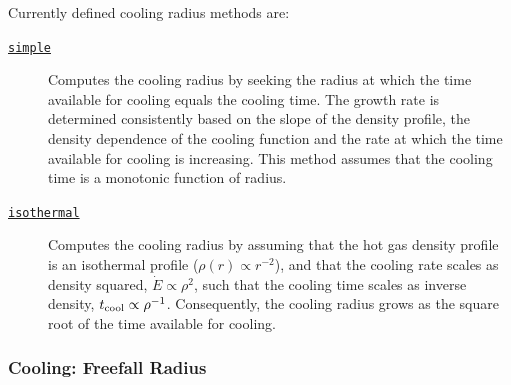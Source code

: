 Currently defined cooling radius methods are:
\begin{description}
 \item [\hyperlink{cooling.cooling_radius.simple.F90:cooling_radii_simple:cooling_radius_simple}{{\tt simple}}] Computes the cooling radius by seeking the radius at which the time available for cooling equals the cooling time. The growth rate is determined consistently based on the slope of the density profile, the density dependence of the cooling function and the rate at which the time available for cooling is increasing. This method assumes that the cooling time is a monotonic function of radius.
 \item [\hyperlink{cooling.cooling_radius.isothermal_profile.F90:cooling_radii_isothermal:cooling_radius_isothermal}{{\tt isothermal}}] Computes the cooling radius by assuming that the hot gas density profile is an isothermal profile ($\rho(r) \propto r^{-2}$), and that the cooling rate scales as density squared, $\dot{E}\propto \rho^2$, such that the cooling time scales as inverse density, $t_{\rm cool} \propto \rho^{-1}$. Consequently, the cooling radius grows as the square root of the time available for cooling.
\end{description}

\subsubsection{Cooling: Freefall Radius}

